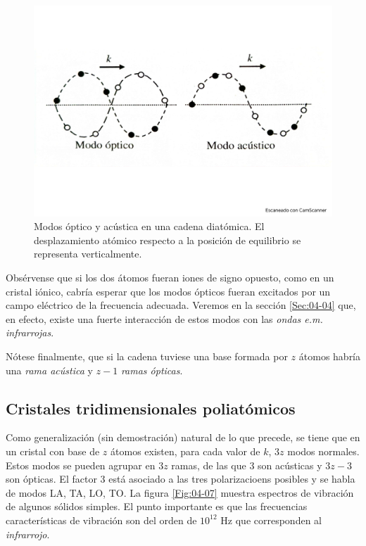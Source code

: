 \begin{figure}[h!] \centering
    \includegraphics[scale=0.37]{Cuerpo/Ch_04/Fotos libro 6.pdf}
    \caption{Modos óptico y acústica en una cadena diatómica. El desplazamiento atómico respecto a la posición de equilibrio se representa verticalmente.}
    \label{Fig:04-06}
\end{figure}    

Obsérvense que si los dos átomos fueran iones de signo opuesto, como en un cristal iónico, cabría esperar que los modos ópticos fueran excitados por un campo eléctrico de la frecuencia adecuada. Veremos en la sección \ref{Sec:04-04} que, en efecto, existe una fuerte interacción de estos modos con las \textit{ondas e.m. infrarrojas}. 

Nótese finalmente, que si la cadena tuviese una base formada por $z$ átomos habría una \textit{rama acústica} y $z-1$ \textit{ramas ópticas}.

\subsection{Cristales tridimensionales poliatómicos}

Como generalización (sin demostración) natural de lo que precede, se tiene que en un cristal con base de $z$ átomos existen, para cada valor de $k$, $3z$ modos normales. Estos modos se pueden agrupar en $3z$ ramas, de las que $3$ son acústicas y $3z-3$ son ópticas. El factor 3 está asociado a las tres polarizacioens posibles y se habla de modos LA, TA, LO, TO. La figura \ref{Fig:04-07} muestra espectros de vibración de algunos sólidos simples. El punto importante es que las frecuencias características de vibración son del orden de $10^{12}$ Hz que corresponden al \textit{infrarrojo}.

